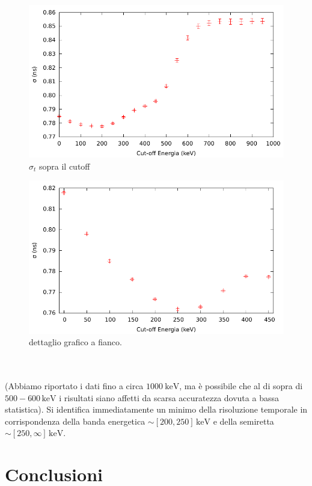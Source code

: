 \documentclass[a4paper,11pt,italian]{report}
\begin{document}
~\\
\begin{minipage}{0.45\linewidth}
	\centering
	\begin{figure}[H]
	\includegraphics[width=\columnwidth,keepaspectratio]{../out/Cutoff}
	\caption{\small{$\sigma_t$ sopra il cutoff}}
	\end{figure}
\end{minipage}
\begin{minipage}{0.45\linewidth}
	\begin{figure}[H]
	\includegraphics[width=\columnwidth,keepaspectratio]{../out/Cutoff2}
	\caption{\small{dettaglio grafico a fianco.}}
	\end{figure}
\end{minipage}
~\\~\\
(Abbiamo riportato i dati fino a circa $\SI{1000}{\kilo\electronvolt}$, ma è possibile che al di sopra di $500-600\,\si{\kilo\electronvolt}$ i risultati siano affetti da scarsa accuratezza dovuta a bassa statistica). Si identifica immediatamente un minimo della risoluzione temporale in corrispondenza della banda energetica $\sim [200 , 250] \, \si{\kilo\electronvolt}$ e della semiretta $\sim [250 , \infty] \, \si{\kilo\electronvolt}$.

\section*{Conclusioni}
\end{document}
